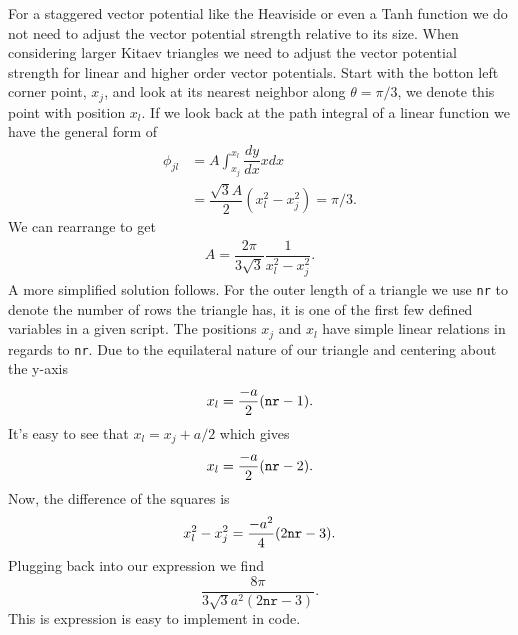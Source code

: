 For a staggered vector potential like the Heaviside or even a Tanh function we do not need to adjust the vector potential strength relative to its size.
When considering larger Kitaev triangles we need to adjust the vector potential strength for linear and higher order vector potentials.
Start with the botton left corner point, $x_j$, and look at its nearest neighbor along $\theta=\pi/3$, we denote this point with position $x_l$.
If we look back at the path integral of a linear function we have the general form of
\begin{align}
  \phi_{jl} &= A \int_{x_j}^{x_l} \dfrac{dy}{dx} x dx \nonumber \\
  &= \dfrac{\sqrt{3} A}{2} (x_l^2 - x_j^2) = \pi/3. \nonumber
\end{align}
We can rearrange to get
\begin{align}
  A = \dfrac{2 \pi}{3 \sqrt{3}} \dfrac{1}{x_l^2 - x_j^2}.
\end{align}
A more simplified solution follows.
For the outer length of a triangle we use \verb|nr| to denote the number of rows the triangle has, it is one of the first few defined variables in a given script.
The positions $x_j$ and $x_l$ have simple linear relations in regards to \verb|nr|.
Due to the equilateral nature of our triangle and centering about the y-axis
\begin{equation}
  x_l = \dfrac{-a}{2} (\verb|nr| - 1).
\end{equation}
It's easy to see that $x_l = x_j + a/2$ which gives
\begin{equation}
  x_l = \dfrac{-a}{2} (\verb|nr| - 2).
\end{equation}
Now, the difference of the squares is
\begin{equation}
  x_l^2 - x_j^2 = \dfrac{-a^2}{4} (2 \verb|nr| - 3).
\end{equation}
Plugging back into our expression we find
\begin{equation}
  \dfrac{8 \pi}{3 \sqrt{3} a^2 (2 \texttt{nr}- 3)}.
\end{equation}
This is expression is easy to implement in code.
